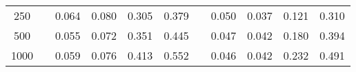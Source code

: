 % 
\begin{tabular}{ccccccccccc}
  \hline
  \hline
250 &  & 0.064 & 0.080 & 0.305 & 0.379 &  & 0.050 & 0.037 & 0.121 & 0.310 \\ 
  500 &  & 0.055 & 0.072 & 0.351 & 0.445 &  & 0.047 & 0.042 & 0.180 & 0.394 \\ 
  1000 &  & 0.059 & 0.076 & 0.413 & 0.552 &  & 0.046 & 0.042 & 0.232 & 0.491 \\ 
   \hline
\end{tabular}
